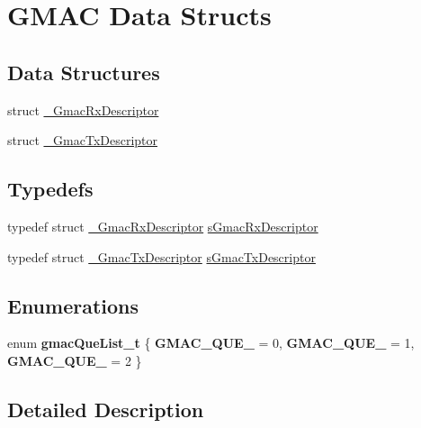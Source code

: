 \hypertarget{group__gmac__structs}{}\section{G\+M\+AC Data Structs}
\label{group__gmac__structs}
\subsection*{Data Structures}
\begin{DoxyCompactItemize}
\item 
struct \mbox{\hyperlink{struct__GmacRxDescriptor}{\+\_\+\+Gmac\+Rx\+Descriptor}}
\item 
struct \mbox{\hyperlink{struct__GmacTxDescriptor}{\+\_\+\+Gmac\+Tx\+Descriptor}}
\end{DoxyCompactItemize}
\subsection*{Typedefs}
\begin{DoxyCompactItemize}
\item 
typedef struct \mbox{\hyperlink{struct__GmacRxDescriptor}{\+\_\+\+Gmac\+Rx\+Descriptor}} \mbox{\hyperlink{group__gmac__structs_ga60c9fd1b0bff688c6e72c825d088a50b}{s\+Gmac\+Rx\+Descriptor}}
\item 
typedef struct \mbox{\hyperlink{struct__GmacTxDescriptor}{\+\_\+\+Gmac\+Tx\+Descriptor}} \mbox{\hyperlink{group__gmac__structs_ga69a2b24578edebf2e816c4d3ca20edeb}{s\+Gmac\+Tx\+Descriptor}}
\end{DoxyCompactItemize}
\subsection*{Enumerations}
\begin{DoxyCompactItemize}
\item 
\mbox{\label{group__gmac__structs_gaa96c205f4dd4f8bb519fdea369396db6}} 
enum {\bfseries gmac\+Que\+List\+\_\+t} \{ {\bfseries G\+M\+A\+C\+\_\+\+Q\+U\+E\+\_} = 0, 
{\bfseries G\+M\+A\+C\+\_\+\+Q\+U\+E\+\_} = 1, 
{\bfseries G\+M\+A\+C\+\_\+\+Q\+U\+E\+\_} = 2
 \}
\end{DoxyCompactItemize}


\subsection{Detailed Description}


